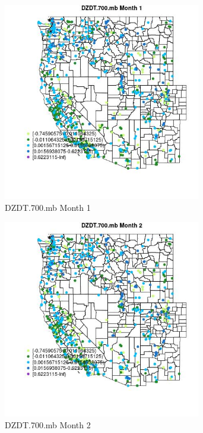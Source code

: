 \begin{figure} 
\centering  
\includegraphics[width=0.77\textwidth]{Code_Outputs/Report_ML_input_PM25_Step4_part_e_de_duplicated_aves_compiled_2019-05-21wNAs_MapObsMo1DZDT700mb.jpg} 
\caption{\label{fig:Report_ML_input_PM25_Step4_part_e_de_duplicated_aves_compiled_2019-05-21wNAsMapObsMo1DZDT700mb}DZDT.700.mb Month 1} 
\end{figure} 
 

\begin{figure} 
\centering  
\includegraphics[width=0.77\textwidth]{Code_Outputs/Report_ML_input_PM25_Step4_part_e_de_duplicated_aves_compiled_2019-05-21wNAs_MapObsMo2DZDT700mb.jpg} 
\caption{\label{fig:Report_ML_input_PM25_Step4_part_e_de_duplicated_aves_compiled_2019-05-21wNAsMapObsMo2DZDT700mb}DZDT.700.mb Month 2} 
\end{figure} 
 

